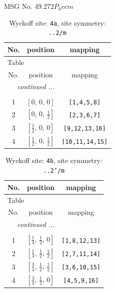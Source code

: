 \documentclass[fleqn,8pt]{jsarticle}
\begin{document}
\setcounter{MaxMatrixCols}{32}

\renewcommand{\tablename}{Table~}
\renewcommand{\figurename}{Figure~}
\begin{center}
\LARGE
MSG No. 49.272\quad$P_{a}ccm$
\end{center}
\renewcommand{\arraystretch}{1.2}
\begin{longtable}{ccc}
\caption{Wyckoff site: {\tt 4a}, site symmetry: {\tt ..2/m}}
 \\
 \hline \hline
No. & position & mapping \\ \hline \endfirsthead

\multicolumn{2}{l}{\tablename\ \thetable{}} \\
 \hline \hline
No. & position & mapping \\ \hline \endhead

 \hline \hline
\multicolumn{2}{r}{\footnotesize\it continued ...} \\ \endfoot

 \hline \hline
\multicolumn{2}{r}{} \\ \endlastfoot

1 & $\left[ 0,\, 0,\, 0 \right]$ & {\tt [1,4,5,8]} \\ \hline
2 & $\left[ 0,\, 0,\, \frac{1}{2} \right]$ & {\tt [2,3,6,7]} \\ \hline
3 & $\left[ \frac{1}{2},\, 0,\, 0 \right]$ & {\tt [9,12,13,16]} \\ \hline
4 & $\left[ \frac{1}{2},\, 0,\, \frac{1}{2} \right]$ & {\tt [10,11,14,15]} \\
\end{longtable}
\renewcommand{\arraystretch}{1.2}
\begin{longtable}{ccc}
\caption{Wyckoff site: {\tt 4b}, site symmetry: {\tt ..2'/m}}
 \\
 \hline \hline
No. & position & mapping \\ \hline \endfirsthead

\multicolumn{2}{l}{\tablename\ \thetable{}} \\
 \hline \hline
No. & position & mapping \\ \hline \endhead

 \hline \hline
\multicolumn{2}{r}{\footnotesize\it continued ...} \\ \endfoot

 \hline \hline
\multicolumn{2}{r}{} \\ \endlastfoot

1 & $\left[ \frac{1}{4},\, \frac{1}{2},\, 0 \right]$ & {\tt [1,8,12,13]} \\ \hline
2 & $\left[ \frac{1}{4},\, \frac{1}{2},\, \frac{1}{2} \right]$ & {\tt [2,7,11,14]} \\ \hline
3 & $\left[ \frac{3}{4},\, \frac{1}{2},\, \frac{1}{2} \right]$ & {\tt [3,6,10,15]} \\ \hline
4 & $\left[ \frac{3}{4},\, \frac{1}{2},\, 0 \right]$ & {\tt [4,5,9,16]} \\
\end{longtable}
\end{document}
